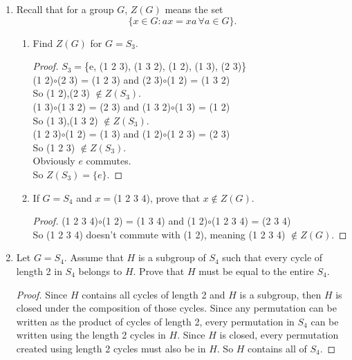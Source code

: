 \documentclass[12pt]{article}
\begin{document}
\begin{enumerate}
		\item Recall that for a group $G$, $Z(G)$ means the set 
		\[\{x \in G : ax = xa \, \forall a \in G\}.\]
		\begin{enumerate}
			\item Find $Z(G)$ for $G = S_3$.
			\begin{proof}
				$S_3 = $\{e, (1 2 3), (1 3 2), (1 2), (1 3), (2 3)\}\\
				(1 2)$\circ$(2 3) = (1 2 3) and (2 3)$\circ$(1 2) = (1 3 2)\\
				So (1 2),(2 3) $\nin Z(S_3)$.\\
				(1 3)$\circ$(1 3 2) = (2 3) and (1 3 2)$\circ$(1 3) = (1 2)\\
				So (1 3),(1 3 2) $\nin Z(S_3)$.\\
				(1 2 3)$\circ$(1 2) = (1 3) and (1 2)$\circ$(1 2 3) = (2 3)\\
				So (1 2 3) $\nin Z(S_3)$.\\
				Obviously $e$ commutes.\\
				So $Z(S_3) = \{e\}$.
			\end{proof}
			\item If $G = S_4$ and $x = $(1 2 3 4), prove that $x \nin Z(G)$.
			\begin{proof}
				(1 2 3 4)$\circ$(1 2) = (1 3 4) and (1 2)$\circ$(1 2 3 4) = (2 3 4)\\
				So (1 2 3 4) doesn't commute with (1 2), meaning (1 2 3 4) $\nin Z(G)$.
			\end{proof}
		\end{enumerate}
	
		\item Let $G = S_4$. Assume that $H$ is a subgroup of $S_4$ such that every cycle of length 2 in $S_4$ belongs to $H$. Prove that $H$ must be equal to the entire $S_4$.
		\begin{proof}
			Since $H$ contains all cycles of length 2 and $H$ is a subgroup, then $H$ is closed under the composition of those cycles. Since any permutation can be written as the product of cycles of length 2, every permutation in $S_4$ can be written using the length 2 cycles in $H$. Since $H$ is closed, every permutation created using length 2 cycles must also be in $H$. So $H$ contains all of $S_4$.
		\end{proof}
	\end{enumerate}
\end{document}
